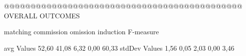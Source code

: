 @@@@@@@@@@@@@@@@@@@@@@@@@@@@@@@@@@@@@@@@@@@@@ OVERALL OUTCOMES

                matching commission   omission  induction    F-measure   

avg Values      52,60      41,08       6,32      0,00        60,33      
stdDev Values   1,56       0,05       2,03      0,00         3,46




